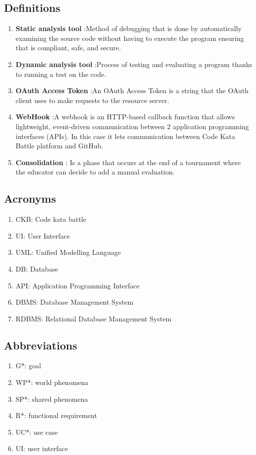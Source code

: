 \subsection{Definitions}
\begin{enumerate} [label=\textbullet]
    \item \textbf{Static analysis tool} :Method of debugging that is done by automatically examining the source code without having to execute the program ensuring that is  compliant, safe, and secure.
    \item \textbf{Dynamic analysis tool} :Process of testing and evaluating a program thanks to running a test on the code.
    \item \textbf{OAuth Access Token} :An OAuth Access Token is a string that the OAuth client uses to make requests to the resource server.
    \item \textbf{WebHook} :A webhook is an HTTP-based callback function that allows lightweight, event-driven communication between 2 application programming interfaces (APIs). In this case it lets communication between Code Kata Battle platform and GitHub.
    \item \textbf{Consolidation} : Is a phase that occurs at the end of a tournament where the educator can decide to add a manual evaluation.
\end{enumerate}
\subsection{Acronyms}
    \begin{enumerate}[label=\textbullet]
        \item CKB: Code kata battle
        \item UI: User Interface
        \item UML: Unified Modelling Language
        \item DB: Database
        \item API: Application Programming Interface
        \item DBMS: Database Management System
        \item RDBMS: Relational Database Management System
    \end{enumerate}

\subsection{Abbreviations}
\begin{enumerate}[label=\textbullet]
    \item G*: goal
    \item WP*: world phenomena
    \item SP*: shared phenomena
    \item R*: functional requirement
    \item UC*: use case
    \item UI: user interface
\end{enumerate}
    
